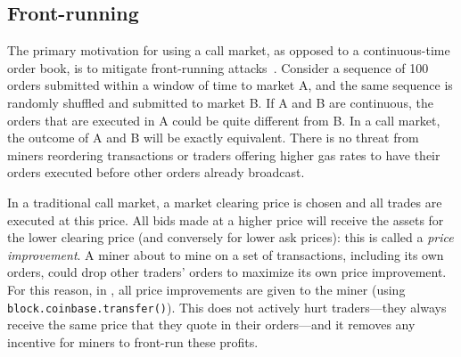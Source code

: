 \subsection{Front-running} \label{sec:front}



The primary motivation for using a call market, as opposed to a continuous-time order book, is to mitigate front-running attacks~\cite{clark2014decentralizing,eskandari2019sok,daian2019flash}. Consider a sequence of 100 orders submitted within a window of time to market A, and the same sequence is randomly shuffled and submitted to market B. If A and B are continuous, the orders that are executed in A could be quite different from B. In a call market, the outcome of A and B will be exactly equivalent. There is no threat from miners reordering transactions or traders offering higher gas rates to have their orders executed before other orders already broadcast. 

In a traditional call market, a market clearing price is chosen and all trades are executed at this price. All bids made at a higher price will receive the assets for the lower clearing price (and conversely for lower ask prices): this is called a \textit{price improvement}. A miner about to mine on a set of transactions, including its own orders, could drop other traders' orders to maximize its own price improvement. For this reason, in \cm, all price improvements are given to the miner (using \texttt{block.coinbase.transfer()}). This does not actively hurt traders---they always receive the same price that they quote in their orders---and it removes any incentive for miners to front-run these profits. 

